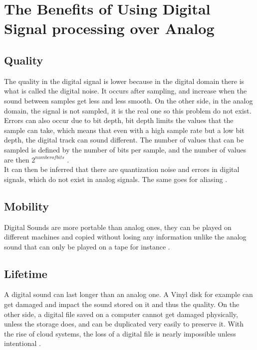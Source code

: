\section{The Benefits of Using Digital Signal processing over Analog}
\subsection{Quality}


The quality in the digital signal is  lower because in the digital domain there is what is called the digital noise. It occurs after sampling, and increase when the sound between samples get less and less smooth. On the other side, in the analog domain, the signal is not sampled, it is the real one so this problem do not exist. Errors can also occur due to bit depth, bit depth limits the values that the sample can take, which means that even with a high sample rate but a low bit depth, the digital track can sound different. The number of values that can be sampled is defined by the number of bits per sample, and the number of values are then $2^{number of bits}$ \citep{analog_quality}.\\
It can then be inferred that there are quantization noise and errors in digital signals, which do not exist in analog signals. The same goes for aliasing \citep{analog_aliasing}. 

\subsection{Mobility}

Digital Sounds are more portable than analog ones, they can be played on different machines and copied without losing any information unlike the analog sound that can only be played on a tape for instance \citep{analog_quality}. 

\subsection{Lifetime}

A digital sound can last longer than an analog one. A Vinyl disk for example can get damaged and impact the sound stored on it and thus the quality. On the other side, a digital file saved on a computer cannot get damaged physically, unless the storage does, and can be duplicated very easily to preserve it. With the rise of cloud systems, the loss of a digital file is nearly impossible unless intentional \citep{analog_storage}.



